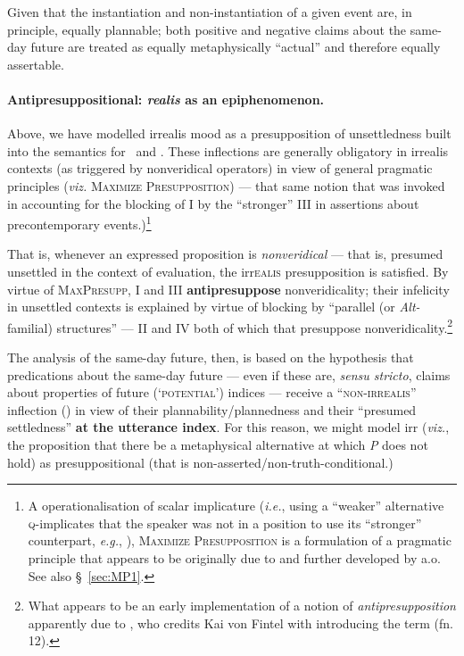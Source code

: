  Given that the instantiation and non-instantiation of a given event are, in principle, equally plannable; both positive and negative claims about the same-day future are treated as equally metaphysically ``actual'' and therefore equally assertable.

\paragraph{Antipresuppositional: \textit{realis} as an epiphenomenon.}Above, we have modelled irrealis mood as a presupposition of unsettledness built into the semantics for \II~and \IV. These inflections are generally obligatory in irrealis contexts (as triggered by nonveridical operators) in view of general pragmatic principles (\textit{viz.} \textsc{Maximize Presupposition)} --- that same notion that was invoked in accounting for the blocking of \gls{I} by the ``stronger'' \gls{III} in assertions about precontemporary events.)\footnote{A operationalisation of scalar implicature (\textit{i.e.}, using a ``weaker'' alternative \textsc{q}-implicates that the speaker was not in a position to use its ``stronger'' counterpart,\textit{ e.g.}, \citealt{Horn1984}), \textsc{Maximize Presupposition} is a formulation of a pragmatic principle that appears to be originally due to \citet{Heim1991} and further developed by \citet{Sauerland2009,Percus2006} a.o. See also \S~\ref{sec:MP1}.} 

That is, whenever an expressed proposition is \textit{nonveridical} --- that is, presumed unsettled in the context of evaluation, the \gls{irr}\textsc{ealis} presupposition is satisfied. By virtue of \textsc{MaxPresupp}, \gls{I} and \gls{III} \textbf{antipresuppose} nonveridicality; their infelicity in unsettled contexts is explained by virtue of blocking by ``parallel (or \textit{Alt-}familial) structures'' --- \gls{II} and \gls{IV} both of which that presuppose nonveridicality.\footnote{What appears to be an early implementation of a notion of \textit{antipresupposition} apparently due to \citet{Percus2006}, who credits Kai von Fintel with introducing the term (fn. 12).}

The analysis of the same-day future, then, is based on the hypothesis that predications about the same-day future --- even if these are, \textit{sensu stricto}, claims about properties of future (`\textsc{potential}') indices --- receive a ``\textsc{non-irrealis}'' inflection (\I{}) in view of their plannability/plannedness and their ``presumed settledness'' \textbf{at the utterance index}. For this reason, we might model \gls{irr} (\textit{viz.}, the proposition that there be a metaphysical alternative at which \textit{P} does not hold) as presuppositional (that is non-asserted/non-truth-conditional.) 

